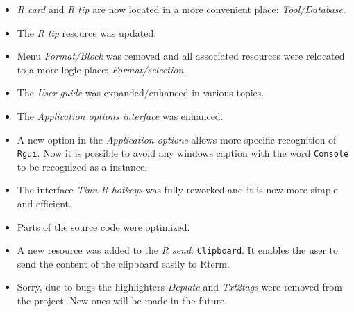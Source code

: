\begin{itemize}
  \item \textit{R card} and \textit{R tip} are now located in a more
    convenient place: \textit{Tool/Database}.
  \item The \textit{R tip} resource was updated.
  \item Menu \textit{Format/Block} was removed and all associated resources
    were relocated to a more logic place: \textit{Format/selection}.
  \item The \textit{User guide} was expanded/enhanced in various topics.
  \item The \textit{Application options interface} was enhanced.
  \item A new option in the \textit{Application options} allows more specific
    recognition of \texttt{Rgui}. Now it is possible to avoid any windows
    caption with the word \texttt{Console} to be recognized as a \RR{}
    instance.
  \item The interface \textit{Tinn-R hotkeys} was fully reworked and it is now
    more simple and efficient.
  \item Parts of the source code were optimized.
  \item A new resource was added to the \textit{R send}: \texttt{Clipboard}.
    It enables the user to send the content of the clipboard easily to Rterm.
  \item Sorry, due to bugs the highlighters \textit{Deplate} and \textit{Txt2tags}
    were removed from the project. New ones will be made in the future.
\end{itemize}


